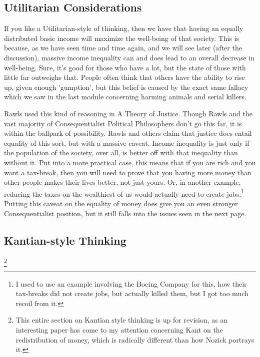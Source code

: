 \subsection{Utilitarian Considerations}

If you like a Utilitarian-style of thinking, then we have that having an equally distributed basic income will maximize the well-being of that society. This is because, as we have seen time and time again, and we will see later (after the discussion), massive income inequality can and does lead to an overall decrease in well-being. Sure, it's good for those who have a lot, but the state of those with little far outweighs that. People often think that others have the ability to rise up, given enough 'gumption', but this belief is caused by the exact same fallacy which we saw in the last module concerning harming animals and serial killers. 

Rawls used this kind of reasoning in A Theory of Justice. Though Rawls and the vast majority of Consequentialist Political Philosophers don't go this far, it is within the ballpark of possibility. Rawls and others claim that justice does entail equality of this sort, but with a massive caveat. Income inequality is just only if the population of the society, over all, is better off with that inequality than without it. Put into a more practical case, this means that if you are rich and you want a tax-break, then you will need to prove that you having more money than other people makes their lives better, not just yours. Or, in another example, reducing the taxes on the wealthiest of us would actually need to create jobs.\footnote{I used to use an example involving the Boeing Company for this, how their tax-breaks did not create jobs, but actually killed them, but I got too much recoil from it.} Putting this caveat on the equality of money does give you an even stronger Consequentialist position, but it still falls into the issues seen in the next page.
\subsection{Kantian-style Thinking}\footnote{This entire section on Kantian style thinking is up for revision, as an interesting paper has come to my attention concerning Kant on the redistribution of money, which is radically different than how Nozick portrays it.}

